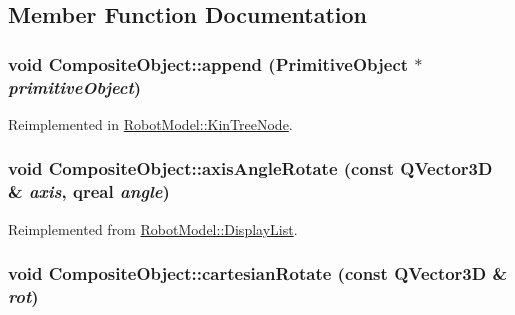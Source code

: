 \subsection{Member Function Documentation}
\hypertarget{class_robot_model_1_1_composite_object_ad33452f1246939d366ffbf02d1022a91}{
\subsubsection[{append}]{\setlength{\rightskip}{0pt plus 5cm}void CompositeObject::append ({\bf PrimitiveObject} $\ast$ {\em primitiveObject})}}
\label{class_robot_model_1_1_composite_object_ad33452f1246939d366ffbf02d1022a91}


Reimplemented in \hyperlink{class_robot_model_1_1_kin_tree_node_af043fc57074a449364d2a6ec09be46a3}{RobotModel::KinTreeNode}.\hypertarget{class_robot_model_1_1_composite_object_a357f5ed3f49e0889df511271e468f866}{
\subsubsection[{axisAngleRotate}]{\setlength{\rightskip}{0pt plus 5cm}void CompositeObject::axisAngleRotate (const QVector3D \& {\em axis}, \/  qreal {\em angle})}}
\label{class_robot_model_1_1_composite_object_a357f5ed3f49e0889df511271e468f866}


Reimplemented from \hyperlink{class_robot_model_1_1_display_list_a9a7084168997ac285ee1e9f4041a8d57}{RobotModel::DisplayList}.\hypertarget{class_robot_model_1_1_composite_object_adadc29cccbba9cb615eaf0ad2fbdd337}{
\subsubsection[{cartesianRotate}]{\setlength{\rightskip}{0pt plus 5cm}void CompositeObject::cartesianRotate (const QVector3D \& {\em rot})}}
\label{class_robot_model_1_1_composite_object_adadc29cccbba9cb615eaf0ad2fbdd337}


